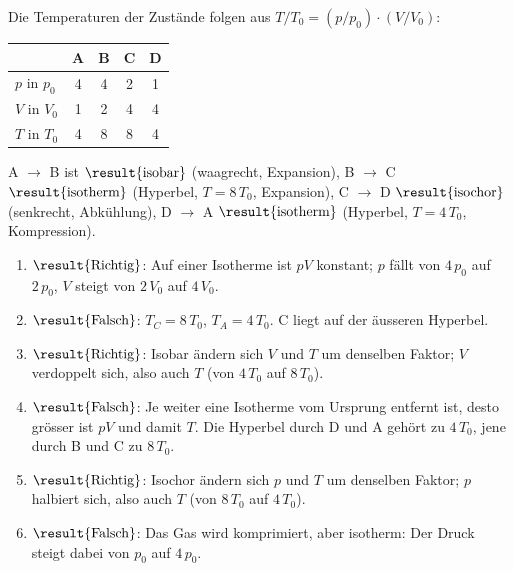 Die Temperaturen der Zustände folgen aus $T/T_0 = (p/p_0)\cdot(V/V_0)$:
\begin{center}
\begin{tabular}{lcccc}
 & A & B & C & D \\ \hline
 $p$ in $p_0$ & 4 & 4 & 2 & 1 \\
 $V$ in $V_0$ & 1 & 2 & 4 & 4 \\
 $T$ in $T_0$ & 4 & 8 & 8 & 4
\end{tabular}
\end{center}
\begin{abcliste}
\abc A $\to$ B ist $\result{\text{isobar}}$ (waagrecht, Expansion), B $\to$ C $\result{\text{isotherm}}$ (Hyperbel, $T = 8\,T_0$, Expansion), C $\to$ D $\result{\text{isochor}}$ (senkrecht, Abkühlung), D $\to$ A $\result{\text{isotherm}}$ (Hyperbel, $T = 4\,T_0$, Kompression).

\abc
\begin{enumerate}
\item $\result{\text{Richtig}}$: Auf einer Isotherme ist $pV$ konstant; $p$ fällt von $4\,p_0$ auf $2\,p_0$, $V$ steigt von $2\,V_0$ auf $4\,V_0$.
\item $\result{\text{Falsch}}$: $T_C = 8\,T_0$, $T_A = 4\,T_0$. C liegt auf der äusseren Hyperbel.
\item $\result{\text{Richtig}}$: Isobar ändern sich $V$ und $T$ um denselben Faktor; $V$ verdoppelt sich, also auch $T$ (von $4\,T_0$ auf $8\,T_0$).
\item $\result{\text{Falsch}}$: Je weiter eine Isotherme vom Ursprung entfernt ist, desto grösser ist $pV$ und damit $T$. Die Hyperbel durch D und A gehört zu $4\,T_0$, jene durch B und C zu $8\,T_0$.
\item $\result{\text{Richtig}}$: Isochor ändern sich $p$ und $T$ um denselben Faktor; $p$ halbiert sich, also auch $T$ (von $8\,T_0$ auf $4\,T_0$).
\item $\result{\text{Falsch}}$: Das Gas wird komprimiert, aber isotherm: Der Druck steigt dabei von $p_0$ auf $4\,p_0$.
\end{enumerate}
\end{abcliste}
